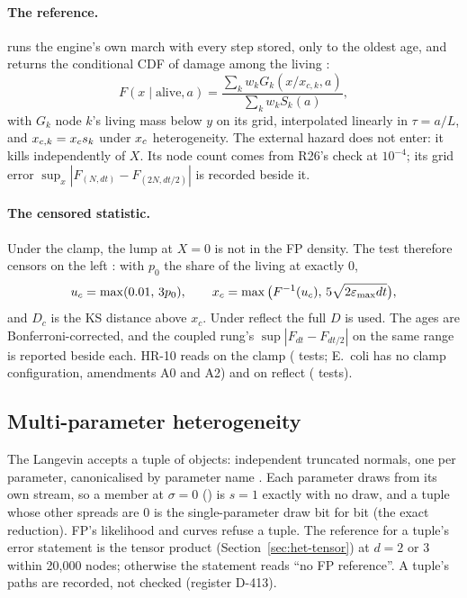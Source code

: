 \paragraph{The reference.}  runs the engine's own march with every step stored, only to the
oldest age, and returns the conditional CDF of damage among the living :
\begin{equation}
  F(x\mid\text{alive},a)=\frac{\sum_kw_kG_k(x/x_{c,k},a)}{\sum_kw_kS_k(a)},
\end{equation}
with $G_k$ node $k$'s living mass below $y$ on its grid, interpolated linearly in $\tau=a/L$, and $x_{c,k}=x_c s_k$
under $x_c$ heterogeneity. The external hazard does not enter: it kills independently of $X$. Its node count comes from
R26's check at $10^{-4}$; its grid error $\sup_x|F_{(N,dt)}-F_{(2N,dt/2)}|$ is recorded beside it.

\paragraph{The censored statistic.} Under the clamp, the lump at $X=0$ is not in the FP density. The test therefore
censors on the left : with $p_0$ the share of the living at exactly 0,
\begin{equation}
  u_c=\max(0.01,\,3p_0),\qquad x_c=\max\big(F^{-1}(u_c),\,5\sqrt{2\varepsilon_{\max}dt}\big),
\end{equation}
and $D_c$ is the KS distance above $x_c$. Under reflect the full $D$ is used. The ages are Bonferroni-corrected, and
the coupled rung's $\sup|F_{dt}-F_{dt/2}|$ on the same range is reported beside each. HR-10 reads
 on the clamp
( tests; E.~coli has no clamp
configuration, amendments A0 and A2) and 
on reflect ( tests).

\subsection{Multi-parameter heterogeneity}\label{sec:lgv-multi}

The Langevin accepts a tuple of  objects: independent truncated normals, one per parameter,
canonicalised by parameter name . Each parameter draws from its own stream, so a member
at $\sigma=0$ () is $s=1$ exactly with no draw, and a tuple whose other spreads are 0 is the
single-parameter draw bit for bit (the exact reduction). FP's likelihood and curves refuse a tuple. The reference for a
tuple's error statement is the tensor product (Section~\ref{sec:het-tensor}) at $d=2$ or 3 within 20,000 nodes;
otherwise the statement reads ``no FP reference''. A tuple's paths are recorded, not checked (register D-413).

